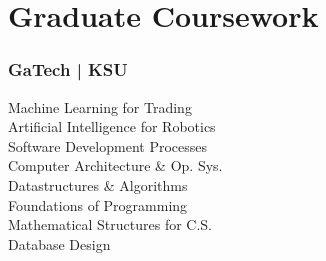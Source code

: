 %
%
%
%
\section{Graduate Coursework}
  \subsubsection{GaTech | KSU}
      {\vspace{0.1em}}
      Machine Learning for Trading\\
      Artificial Intelligence for Robotics\\
      Software Development Processes\\
      Computer Architecture \& Op. Sys.\\
      Datastructures \& Algorithms\\
      Foundations of Programming\\
      Mathematical Structures for C.S.\\
      Database Design\\
%
%
%